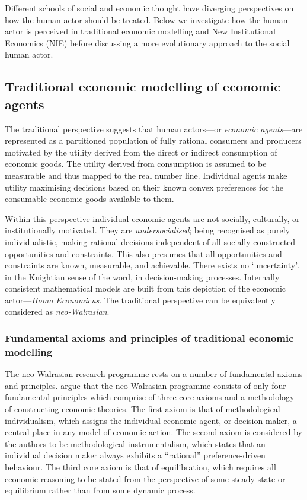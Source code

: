 Different schools of social and economic thought have diverging perspectives on how the human actor should be treated. Below we investigate how the human actor is perceived in traditional economic modelling and New Institutional Economics (NIE) before discussing a more evolutionary approach to the social human actor.

\subsection{Traditional economic modelling of economic agents}

The traditional perspective suggests that human actors---or \emph{economic agents}---are represented as a partitioned population of fully rational consumers and producers motivated by the utility derived from the direct or indirect consumption of economic goods. The utility derived from consumption is assumed to be measurable and thus mapped to the real number line. Individual agents make utility maximising decisions based on their known convex preferences for the consumable economic goods available to them. 

Within this perspective individual economic agents are not socially, culturally, or institutionally motivated. They are \emph{undersocialised}; being recognised as purely individualistic, making rational decisions independent of all socially constructed opportunities and constraints. This also presumes that all opportunities and constraints are known, measurable, and achievable. There exists no `uncertainty', in the Knightian sense of the word, in decision-making processes. Internally consistent mathematical models are built from this depiction of the economic actor---\emph{Homo Economicus}. The traditional perspective can be equivalently considered as \emph{neo-Walrasian}.

\subsubsection{Fundamental axioms and principles of traditional economic modelling}

The neo-Walrasian research programme rests on a number of fundamental axioms and principles. \citet{Arnsperger2006} argue that the neo-Walrasian programme consists of only four fundamental principles which comprise of three core axioms and a methodology of constructing economic theories. The first axiom is that of methodological individualism, which assigns the individual economic agent, or decision maker, a central place in any model of economic action. The second axiom is considered by the authors to be methodological instrumentalism, which states that an individual decision maker always exhibits a ``rational'' preference-driven behaviour. The third core axiom is that of equilibration, which requires all economic reasoning to be stated from the perspective of some steady-state or equilibrium rather than from some dynamic process.

